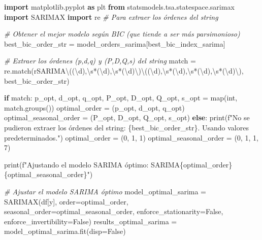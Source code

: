 \documentclass[
  11pt,
]{article}
\newenvironment{Shaded}{}{}
\newcommand{\BuiltInTok}[1]{\textcolor[rgb]{0.00,0.50,0.00}{#1}}
\newcommand{\CommentTok}[1]{\textcolor[rgb]{0.38,0.63,0.69}{\textit{#1}}}
\newcommand{\ControlFlowTok}[1]{\textcolor[rgb]{0.00,0.44,0.13}{\textbf{#1}}}
\newcommand{\DecValTok}[1]{\textcolor[rgb]{0.25,0.63,0.44}{#1}}
\newcommand{\ImportTok}[1]{\textcolor[rgb]{0.00,0.50,0.00}{\textbf{#1}}}
\newcommand{\NormalTok}[1]{#1}
\newcommand{\OperatorTok}[1]{\textcolor[rgb]{0.40,0.40,0.40}{#1}}
\newcommand{\SpecialCharTok}[1]{\textcolor[rgb]{0.25,0.44,0.63}{#1}}
\newcommand{\SpecialStringTok}[1]{\textcolor[rgb]{0.73,0.40,0.53}{#1}}
\newcommand{\StringTok}[1]{\textcolor[rgb]{0.25,0.44,0.63}{#1}}
\newcommand{\VariableTok}[1]{\textcolor[rgb]{0.10,0.09,0.49}{#1}}
\newcommand{\VerbatimStringTok}[1]{\textcolor[rgb]{0.25,0.44,0.63}{#1}}
\begin{document}
\begin{Shaded}
\begin{Highlighting}[]
\ImportTok{import}\NormalTok{ matplotlib.pyplot }\ImportTok{as}\NormalTok{ plt}
\ImportTok{from}\NormalTok{ statsmodels.tsa.statespace.sarimax }\ImportTok{import}\NormalTok{ SARIMAX}
\ImportTok{import}\NormalTok{ re }\CommentTok{\# Para extraer los órdenes del string}

\CommentTok{\# Obtener el mejor modelo según BIC (que tiende a ser más parsimonioso)}
\NormalTok{best\_bic\_order\_str }\OperatorTok{=}\NormalTok{ model\_orders\_sarima[best\_bic\_index\_sarima]}

\CommentTok{\# Extraer los órdenes (p,d,q) y (P,D,Q,s) del string}
\NormalTok{match }\OperatorTok{=}\NormalTok{ re.match(}\VerbatimStringTok{r\textquotesingle{}SARIMA\textbackslash{}((\textbackslash{}d),\textbackslash{}s*(\textbackslash{}d),\textbackslash{}s*(\textbackslash{}d)\textbackslash{})\textbackslash{}((\textbackslash{}d),\textbackslash{}s*(\textbackslash{}d),\textbackslash{}s*(\textbackslash{}d),\textbackslash{}s*(\textbackslash{}d)\textbackslash{})\textquotesingle{}}\NormalTok{, best\_bic\_order\_str)}

\ControlFlowTok{if}\NormalTok{ match:}
\NormalTok{    p\_opt, d\_opt, q\_opt, P\_opt, D\_opt, Q\_opt, s\_opt }\OperatorTok{=} \BuiltInTok{map}\NormalTok{(}\BuiltInTok{int}\NormalTok{, match.groups())}
\NormalTok{    optimal\_order }\OperatorTok{=}\NormalTok{ (p\_opt, d\_opt, q\_opt)}
\NormalTok{    optimal\_seasonal\_order }\OperatorTok{=}\NormalTok{ (P\_opt, D\_opt, Q\_opt, s\_opt)}
\ControlFlowTok{else}\NormalTok{:}
    \BuiltInTok{print}\NormalTok{(}\SpecialStringTok{f"No se pudieron extraer los órdenes del string: }\SpecialCharTok{\{}\NormalTok{best\_bic\_order\_str}\SpecialCharTok{\}}\SpecialStringTok{. Usando valores predeterminados."}\NormalTok{)}
\NormalTok{    optimal\_order }\OperatorTok{=}\NormalTok{ (}\DecValTok{0}\NormalTok{, }\DecValTok{1}\NormalTok{, }\DecValTok{1}\NormalTok{)}
\NormalTok{    optimal\_seasonal\_order }\OperatorTok{=}\NormalTok{ (}\DecValTok{0}\NormalTok{, }\DecValTok{1}\NormalTok{, }\DecValTok{1}\NormalTok{, }\DecValTok{7}\NormalTok{)}

\BuiltInTok{print}\NormalTok{(}\SpecialStringTok{f"Ajustando el modelo SARIMA óptimo: SARIMA}\SpecialCharTok{\{}\NormalTok{optimal\_order}\SpecialCharTok{\}\{}\NormalTok{optimal\_seasonal\_order}\SpecialCharTok{\}}\SpecialStringTok{"}\NormalTok{)}

\CommentTok{\# Ajustar el modelo SARIMA óptimo}
\NormalTok{model\_optimal\_sarima }\OperatorTok{=}\NormalTok{ SARIMAX(df[}\StringTok{\textquotesingle{}y\textquotesingle{}}\NormalTok{], order}\OperatorTok{=}\NormalTok{optimal\_order, seasonal\_order}\OperatorTok{=}\NormalTok{optimal\_seasonal\_order,}
\NormalTok{                               enforce\_stationarity}\OperatorTok{=}\VariableTok{False}\NormalTok{, enforce\_invertibility}\OperatorTok{=}\VariableTok{False}\NormalTok{)}
\NormalTok{results\_optimal\_sarima }\OperatorTok{=}\NormalTok{ model\_optimal\_sarima.fit(disp}\OperatorTok{=}\VariableTok{False}\NormalTok{)}


\end{Highlighting}
\end{Shaded}
\end{document}
